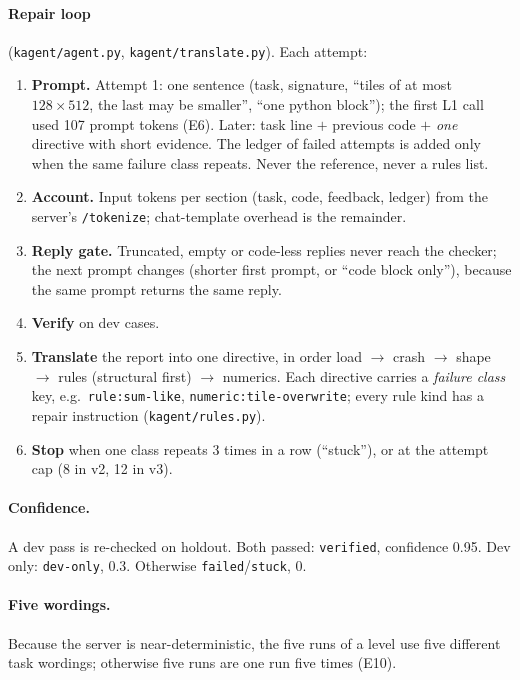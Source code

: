 \documentclass[11pt]{article}
\newcommand{\code}[1]{\texttt{#1}}
\newcommand{\E}[1]{E#1}
\begin{document}
\paragraph{Repair loop} (\code{kagent/agent.py}, \code{kagent/translate.py}). Each attempt:
\begin{enumerate}
  \item \textbf{Prompt.} Attempt 1: one sentence (task, signature, ``tiles of at most $128\times512$, the
        last may be smaller'', ``one python block''); the first L1 call used 107 prompt tokens (\E{6}).
        Later: task line $+$ previous code $+$ \emph{one} directive with short evidence. The ledger of
        failed attempts is added only when the same failure class repeats. Never the reference, never
        a rules list.
  \item \textbf{Account.} Input tokens per section (task, code, feedback, ledger) from the server's
        \code{/tokenize}; chat-template overhead is the remainder.
  \item \textbf{Reply gate.} Truncated, empty or code-less replies never reach the checker; the next
        prompt changes (shorter first prompt, or ``code block only''), because the same prompt returns
        the same reply.
  \item \textbf{Verify} on dev cases.
  \item \textbf{Translate} the report into one directive, in order load $\to$ crash $\to$ shape $\to$
        rules (structural first) $\to$ numerics. Each directive carries a \emph{failure class} key, e.g.\
        \code{rule:sum-like}, \code{numeric:tile-overwrite}; every rule kind has a repair instruction
        (\code{kagent/rules.py}).
  \item \textbf{Stop} when one class repeats 3 times in a row (``stuck''), or at the attempt cap
        (8 in v2, 12 in v3).
\end{enumerate}

\paragraph{Confidence.} A dev pass is re-checked on holdout. Both passed: \code{verified}, confidence
0.95. Dev only: \code{dev-only}, 0.3. Otherwise \code{failed}/\code{stuck}, 0.

\paragraph{Five wordings.} Because the server is near-deterministic, the five runs of a level use five
different task wordings; otherwise five runs are one run five times (\E{10}).
\end{document}
